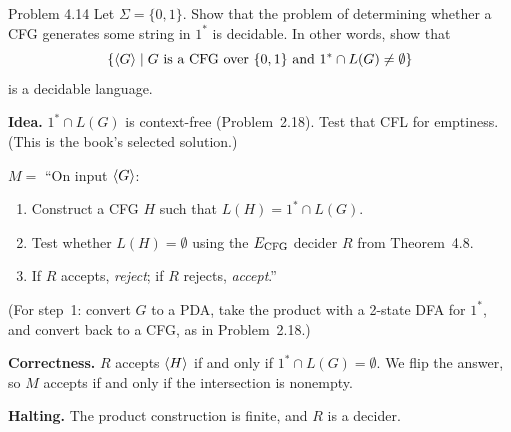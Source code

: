 \begin{question}{Problem 4.14}
Let $\Sigma=\{0,1\}$. Show that the problem of determining whether a CFG generates some string in $1^*$ is decidable. In other words, show that
\[
\{\langle G\rangle\mid\text{$G$ is a CFG over $\{0,1\}$ and $1^*\cap L(G)\ne\emptyset$}\}
\]
is a decidable language.
\end{question}
\begin{soln}
\textbf{Idea.} $1^*\cap L(G)$ is context-free (Problem~2.18). Test that CFL for emptiness. (This is the book's selected solution.)

$M=$ ``On input $\langle G\rangle$:
\begin{enumerate}
\item Construct a CFG $H$ such that $L(H)=1^*\cap L(G)$.
\item Test whether $L(H)=\emptyset$ using the $E_{\mathrm{CFG}}$ decider $R$ from Theorem~4.8.
\item If $R$ accepts, \emph{reject}; if $R$ rejects, \emph{accept}.''
\end{enumerate}

(For step~1: convert $G$ to a PDA, take the product with a 2-state DFA for $1^*$, and convert back to a CFG, as in Problem~2.18.)

\textbf{Correctness.} $R$ accepts $\langle H\rangle$ if and only if $1^*\cap L(G)=\emptyset$. We flip the answer, so $M$ accepts if and only if the intersection is nonempty.

\textbf{Halting.} The product construction is finite, and $R$ is a decider.
\end{soln}

